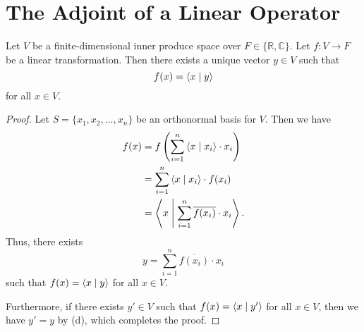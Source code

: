 \section{The Adjoint of a Linear Operator}
\begin{theorem}
  \label{thm:functional}
  Let $V$ be a finite-dimensional inner produce space over
  $F \in \{\mathbb{R}, \mathbb{C}\}$.
  Let $f: V \to F$ be a linear transformation.
  Then there exists a unique vector $y \in V$ such that
  \begin{equation*}
    f(x) = \left\langle x \; \middle| \; y \right\rangle
  \end{equation*}
  for all $x \in V$.
\end{theorem}
\begin{proof}
  Let $S = \{x_1, x_2, \dots, x_n\}$ be an orthonormal basis
  for $V$.
  Then we have
  \begin{align*}
    f(x)
    &= f\left(\sum_{i=1}^n \left\langle x \; \middle| \; x_i \right\rangle \cdot x_i\right) \\
    &= \sum_{i=1}^n \left\langle x \; \middle| \; x_i \right\rangle \cdot f(x_i) \\
    &= \left\langle x \; \middle| \; \sum_{i=1}^n \overline{f(x_i)} \cdot x_i \right\rangle.
  \end{align*}
  Thus, there exists
  \begin{equation*}
    y = \sum_{i=1}^n \overline{f(x_i)} \cdot x_i
  \end{equation*}
  such that $f(x) = \left\langle x \; \middle| \; y \right\rangle$ for all $x \in V$.

  Furthermore, if there exists $y' \in V$ such that $f(x) = \left\langle x \; \middle| \; y' \right\rangle$
  for all $x \in V$, then we have $y' = y$ by 
  (d), which completes the proof.
\end{proof}

